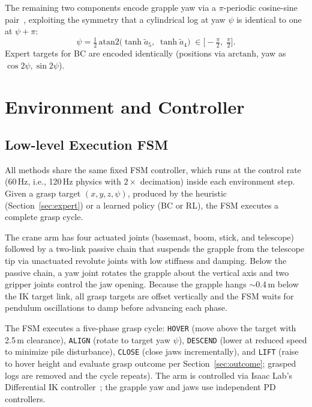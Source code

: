 \documentclass[conference]{IEEEtran}
\begin{document}
The remaining two components encode grapple yaw via a $\pi$-periodic cosine-sine pair~\cite{morrison2018closing}, exploiting the symmetry that a cylindrical log at yaw $\psi$ is identical to one at $\psi + \pi$:
\begin{equation}
    \psi = \tfrac{1}{2}\,\mathrm{atan2}\!\big(\tanh \tilde{a}_5,\;\tanh \tilde{a}_4\big) \;\in \big[-\tfrac{\pi}{2},\;\tfrac{\pi}{2}\big].
\end{equation}
Expert targets for BC are encoded identically (positions via $\mathrm{arctanh}$, yaw as $\cos 2\psi, \sin 2\psi$).

\section{Environment and Controller}
\subsection{Low-level Execution FSM}
All methods share the same fixed FSM controller, which runs at the control rate (60\,Hz, i.e., 120\,Hz physics with $2\times$ decimation) inside each environment step.
Given a grasp target $(x,y,z,\psi)$, produced by the heuristic (Section~\ref{sec:expert}) or a learned policy (BC or RL), the FSM executes a complete grasp cycle.

The crane arm has four actuated joints (basemast, boom, stick, and telescope) followed by a two-link passive chain that suspends the grapple from the telescope tip via unactuated revolute joints with low stiffness and damping.
Below the passive chain, a yaw joint rotates the grapple about the vertical axis and two gripper joints control the jaw opening.
Because the grapple hangs $\sim$0.4\,m below the IK target link, all grasp targets are offset vertically and the FSM waits for pendulum oscillations to damp before advancing each phase.

The FSM executes a five-phase grasp cycle: \texttt{HOVER} (move above the target with 2.5\,m clearance), \texttt{ALIGN} (rotate to target yaw $\psi$), \texttt{DESCEND} (lower at reduced speed to minimize pile disturbance), \texttt{CLOSE} (close jaws incrementally), and \texttt{LIFT} (raise to hover height and evaluate grasp outcome per Section~\ref{sec:outcome}; grasped logs are removed and the cycle repeats).
The arm is controlled via Isaac Lab's Differential IK controller~\cite{mittal2023orbit}; the grapple yaw and jaws use independent PD controllers.
\end{document}
